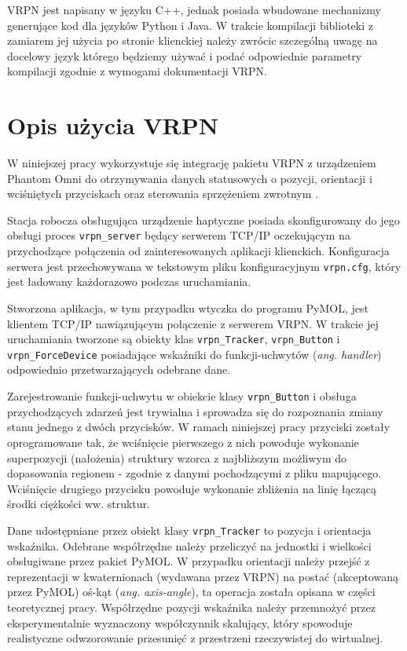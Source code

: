 \documentclass[licencjacka]{pracamgr}
\begin{document}
VRPN jest napisany w języku C++, jednak posiada wbudowane mechanizmy generujące kod dla języków Python i Java. W trakcie kompilacji biblioteki z zamiarem jej użycia po stronie klienckiej należy zwrócic szczególną uwagę na docelowy język którego będziemy używać i podać odpowiednie parametry kompilacji zgodnie z wymogami dokumentacji VRPN. 

\section{Opis użycia VRPN}
W niniejszej pracy wykorzystuje się integrację pakietu VRPN z urządzeniem Phantom Omni do otrzymywania danych statusowych o pozycji, orientacji i wciśniętych przyciskach oraz sterowania sprzężeniem zwrotnym \cite{rodriguezGonzalez2015}.

Stacja robocza obsługująca urządzenie haptyczne posiada skonfigurowany do jego obsługi proces \texttt{vrpn\_server} będący serwerem TCP/IP oczekującym na przychodzące połączenia od zainteresowanych aplikacji klienckich. Konfiguracja serwera jest przechowywana w tekstowym pliku konfiguracyjnym \texttt{vrpn.cfg}, który jest ładowany każdorazowo podczas uruchamiania. 

Stworzona aplikacja, w tym przypadku wtyczka do programu PyMOL, jest klientem TCP/IP nawiązującym połączenie z serwerem VRPN. W trakcie jej uruchamiania tworzone są obiekty klas \texttt{vrpn\_Tracker}, \texttt{vrpn\_Button} i \texttt{vrpn\_ForceDevice} posiadające wskaźniki do funkcji-uchwytów (\textit{ang. handler}) odpowiednio przetwarzających odebrane dane.

Zarejestrowanie funkcji-uchwytu w obiekcie klasy \texttt{vrpn\_Button} i obsługa przychodzących zdarzeń jest trywialna i sprowadza się do rozpoznania zmiany stanu jednego z dwóch przycisków. W ramach niniejszej pracy przyciski zostały oprogramowane tak, że wciśnięcie pierwszego z nich powoduje wykonanie superpozycji (nałożenia) struktury wzorca z najbliższym możliwym do dopasowania regionem - zgodnie z danymi pochodzącymi z pliku mapującego. Wciśnięcie drugiego przycisku powoduje wykonanie zbliżenia na linię łączącą środki ciężkości ww. struktur.

Dane udostępniane przez obiekt klasy \texttt{vrpn\_Tracker} to pozycja i orientacja wskaźnika. Odebrane współrzędne należy przeliczyć na jednostki i wielkości obsługiwane przez pakiet PyMOL. W przypadku orientacji należy przejść z reprezentacji w kwaternionach (wydawana przez VRPN) na postać (akceptowaną przez PyMOL) oś-kąt (\textit{ang. axis-angle}), ta operacja została opisana w części teoretycznej pracy. Współrzędne pozycji wskaźnika należy przemnożyć przez eksperymentalnie wyznaczony współczynnik skalujący, który spowoduje realistyczne odwzorowanie przesunięć z przestrzeni rzeczywistej do wirtualnej.
\end{document}
